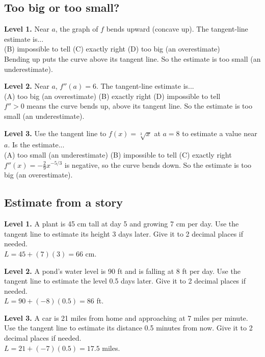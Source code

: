 \documentclass[11pt]{article}
\begin{document}
\subsection*{Too big or too small?}
\noindent\textbf{Level 1.} Near $a$, the graph of $f$ bends upward (concave up). The tangent-line estimate is...\\  \quad (B) impossible to tell \quad (C) exactly right \quad (D) too big (an overestimate)\\  \quad Bending up puts the curve above its tangent line. So the estimate is too small (an underestimate).\par\medskip
\noindent\textbf{Level 2.} Near $a$, $f''(a)=6$. The tangent-line estimate is...\\ (A) too big (an overestimate) \quad (B) exactly right \quad {} \quad (D) impossible to tell\\  \quad $f''>0$ means the curve bends up, above its tangent line. So the estimate is too small (an underestimate).\par\medskip
\noindent\textbf{Level 3.} Use the tangent line to $f(x)=\sqrt[3]{x}$ at $a=8$ to estimate a value near $a$.  Is the estimate...\\ (A) too small (an underestimate) \quad (B) impossible to tell \quad (C) exactly right \quad {}\\  \quad $f''(x)=-\tfrac29x^{-5/3}$ is negative, so the curve bends down. So the estimate is too big (an overestimate).\par\medskip
\subsection*{Estimate from a story}
\noindent\textbf{Level 1.} A plant is 45 cm tall at day 5 and growing 7 cm per day. Use the tangent line to estimate its height 3 days later. Give it to 2 decimal places if needed.\\  \quad $L=45+(7)(3)=66$ cm.\par\medskip
\noindent\textbf{Level 2.} A pond's water level is 90 ft and is falling at 8 ft per day. Use the tangent line to estimate the level 0.5 days later. Give it to 2 decimal places if needed.\\  \quad $L=90+(-8)(0.5)=86$ ft.\par\medskip
\noindent\textbf{Level 3.} A car is 21 miles from home and approaching at 7 miles per minute. Use the tangent line to estimate its distance 0.5 minutes from now. Give it to 2 decimal places if needed.\\  \quad $L=21+(-7)(0.5)=17.5$ miles.\par\medskip
\end{document}
